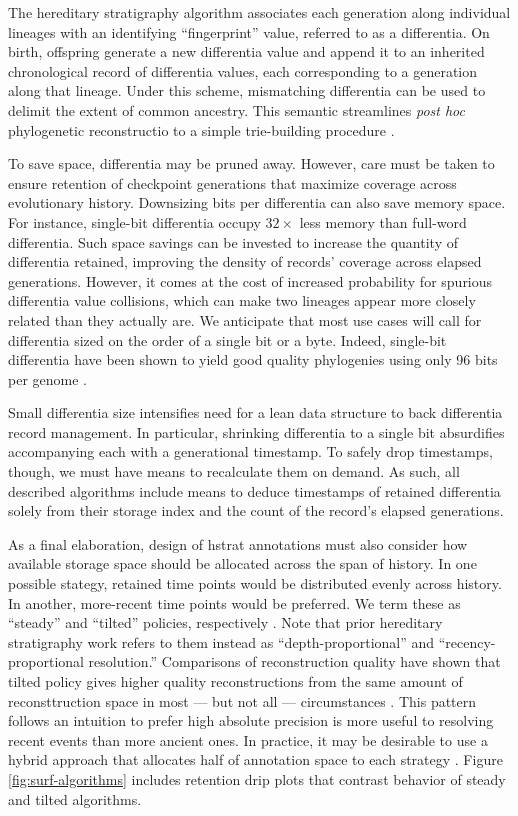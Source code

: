 The hereditary stratigraphy algorithm associates each generation along individual lineages with an identifying ``fingerprint'' value, referred to as a differentia.
On birth, offspring generate a new differentia value and append it to an inherited chronological record of differentia values, each corresponding to a generation along that lineage.
Under this scheme, mismatching differentia can be used to delimit the extent of common ancestry.
This semantic streamlines \textit{post hoc} phylogenetic reconstructio to a simple trie-building procedure
\citep{moreno2024analysis}.

To save space, differentia may be pruned away.
However, care must be taken to ensure retention of checkpoint generations that maximize coverage across evolutionary history.
Downsizing bits per differentia can also save memory space.
For instance, single-bit differentia occupy $32\times$ less memory than full-word differentia.
Such space savings can be invested to increase the quantity of differentia retained, improving the density of records' coverage across elapsed generations.
However, it comes at the cost of increased probability for spurious differentia value collisions, which can make two lineages appear more closely related than they actually are.
We anticipate that most use cases will call for differentia sized on the order of a single bit or a byte.
Indeed, single-bit differentia have been shown to yield good quality phylogenies using only 96 bits per genome \citep{TODOOTHERPAPER}.

Small differentia size intensifies need for a lean data structure to back differentia record management.
In particular, shrinking differentia to a single bit absurdifies accompanying each with a generational timestamp.
To safely drop timestamps, though, we must have means to recalculate them on demand.
As such, all described algorithms include means to deduce timestamps of retained differentia solely from their storage index and the count of the record's elapsed generations.

As a final elaboration, design of hstrat annotations must also consider how available storage space should be allocated across the span of history.
In one possible stategy, retained time points would be distributed evenly across history.
In another, more-recent time points would be preferred.
We term these as ``steady'' and ``tilted'' policies, respectively \citep{THEPAPERWHERETHETERMSAREFROMTODO}.
Note that prior hereditary stratigraphy work refers to them instead as ``depth-proportional'' and ``recency-proportional resolution.''
Comparisons of reconstruction quality have shown that tilted policy gives higher quality reconstructions from the same amount of reconsttruction space in most --- but not all --- circumstances \citep{oTHERPAPERTODO}.
This pattern follows an intuition to prefer high absolute precision is more useful to resolving recent events than more ancient ones.
In practice, it may be desirable to use a hybrid approach that allocates half of annotation space to each strategy \citep{oTHERPAPERTODO}.
Figure \ref{fig:surf-algorithms} includes retention drip plots that contrast behavior of steady and tilted algorithms.

